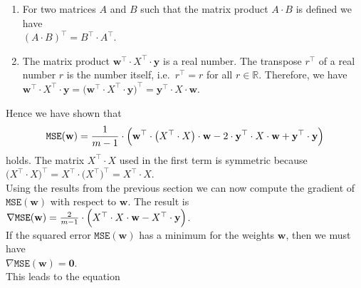\documentclass[12pt]{article}
\begin{document}
\begin{enumerate}
\item For two matrices $A$ and $B$ such that the matrix product $A \cdot B$ is defined we have 
      \\[0.2cm]
      \hspace*{1.3cm}
      $(A \cdot B)^\top = B^\top \cdot A^\top$.
\item The matrix product $\mathbf{w}^\top \cdot X^\top \cdot \mathbf{y}$ is a real number.  The transpose $r^\top$ of a real number $r$ is the number
      itself, i.e.~$r^\top = r$ for all $r \in \mathbb{R}$.  Therefore, we have
      \\[0.2cm]
      \hspace*{1.3cm}
      $\mathbf{w}^\top \cdot X^\top \cdot \mathbf{y} = 
\bigl(\mathbf{w}^\top \cdot X^\top \cdot \mathbf{y}\bigr)^\top =
\mathbf{y}^\top \cdot X \cdot \mathbf{w}
$.
\end{enumerate}
Hence we have shown that
\begin{equation}
  \label{eq:squared-error-4}
  \mathtt{MSE}(\mathbf{w}) = \frac{1}{m-1} \cdot \Bigl(\mathbf{w}^\top \cdot \bigl(X^\top \cdot X\bigr) \cdot \mathbf{w} 
                                             - 2 \cdot \textbf{y}^\top \cdot X \cdot \mathbf{w} 
                                             + \mathbf{y}^\top \cdot \mathbf{y}
                                        \Bigr)
\end{equation}
holds.  The matrix $X^\top \cdot X$ used in the first term is symmetric because
\\[0.2cm]
\hspace*{1.3cm}
$\bigl(X^\top \cdot X\bigr)^\top = X^\top \cdot \bigl(X^\top\bigr)^\top = X^\top \cdot X$.
\\[0.2cm]
Using the results from the previous section we can now compute the gradient of $\mathtt{MSE}(\mathbf{w})$ with respect to
$\mathbf{w}$.  The result is
\\[0.2cm]
\hspace*{1.3cm}
$ \nabla \mathtt{MSE}(\mathbf{w}) = \frac{2}{m-1} \cdot \Bigl(X^\top \cdot X \cdot \mathbf{w} - X^\top \cdot \mathbf{y}\Bigr)$.
\\[0.2cm]
If the squared error $\mathtt{MSE}(\mathbf{w})$ has a minimum for the weights $\mathbf{w}$, then we must have
\\[0.2cm]
\hspace*{1.3cm}
$\nabla \mathtt{MSE}(\mathbf{w}) = \mathbf{0}$.
\\[0.2cm]
This leads to the equation
\\[0.2cm]
\end{document}
